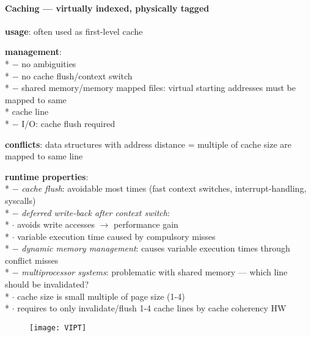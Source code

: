 \paragraph{Caching --- virtually indexed, physically tagged}
\begin{items}
  \item \textbf{usage}: often used as first-level cache
  \item \textbf{management}: \\*
    $ - $ no ambiguities \\*
    $ - $ no cache flush/context switch \\*
    $ - $ shared memory/memory mapped files: virtual starting addresses must be mapped to same \\* \phantom{$ - $} \phantom{$ \cdot $} cache line \\*
    $ - $ I/O: cache flush required
  \item \textbf{conflicts}: data structures with address distance = multiple of cache size are mapped to same line
  \item \textbf{runtime properties}: \\*
    $ - $ \emph{cache flush}: avoidable most times (fast context switches, interrupt-handling, syscalls) \\*
    $ - $ \emph{deferred write-back after context switch}: \\*
      \phantom{$ - $} $ \cdot $ avoids write accesses $ \to $ performance gain \\*
      \phantom{$ - $} $ \cdot $ variable execution time caused by compulsory misses \\*
    $ - $ \emph{dynamic memory management}: causes variable execution times through conflict misses \\*
    $ - $ \emph{multiprocessor systems}: problematic with shared memory --- which line should be invalidated? \\*
      \phantom{$ - $} $ \cdot $ cache size is small multiple of page size (1-4) \\*
      \phantom{$ - $} $ \cdot $ requires to only invalidate/flush 1-4 cache lines by cache coherency HW
\end{items}
\begin{figure}[H]\centering\label{VIPT}\texttt{[image: VIPT]}\end{figure}

